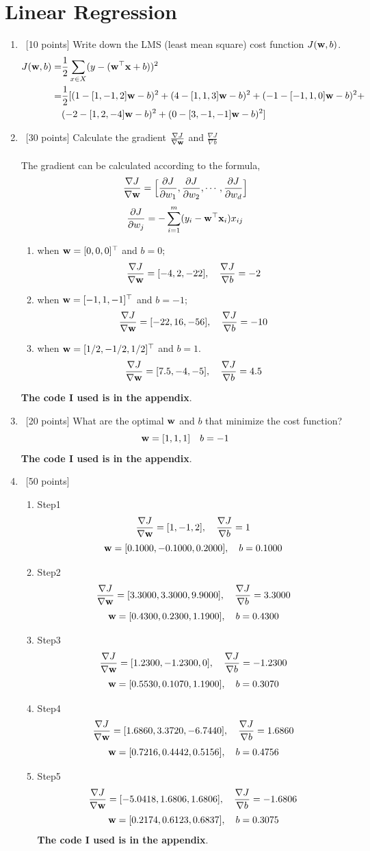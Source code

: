 \documentclass[12pt, fullpage,letterpaper]{article}
\newcommand{\bx}{{\bf x}}
\newcommand{\bw}{{\bf w}}
\begin{document}
\section{Linear Regression}
\begin{enumerate}
\item~[10 points] Write down the LMS (least mean square) cost function $J(\bw, b)$.
\begin{align*}
J(\bw, b)=&\frac{1}{2}\sum_{x\in X}(y-(\bw^\top \bx+b))^2\\
=&\frac{1}{2}[(1-[1,-1,2]\bw-b)^2+(4-[1,1,3]\bw-b)^2+(-1-[-1,1,0]\bw-b)^2+\\&(-2-[1,2,-4]\bw-b)^2+(0-[3,-1,-1]\bw-b)^2]
\end{align*}
\item~[30 points] Calculate the gradient $\frac{\nabla J}{\nabla \bw}$ and $\frac{\nabla J}{\nabla b}$\\\\
The gradient can be calculated according to the formula,
$$\frac{\nabla J}{\nabla \bw}=\Big[\frac{\partial J}{\partial w_1},\frac{\partial J}{\partial w_2},\cdots,\frac{\partial J}{\partial w_d}\Big]$$
$$\frac{\partial J}{\partial w_j}=-\sum_{i=1}^m(y_i-\bw^\top\bx_i)x_{ij}$$
\begin{enumerate}
\item when $\bw = [0,0,0]^\top$ and $b = 0$;
$$\frac{\nabla J}{\nabla \bw}=[-4,2,-22],\quad\frac{\nabla J}{\nabla b}=-2$$
\item when $\bw = [-1,1,-1]^\top$ and $b = -1$;
$$\frac{\nabla J}{\nabla \bw}=[-22,16,-56],\quad\frac{\nabla J}{\nabla b}=-10$$
\item when $\bw = [1/2,-1/2,1/2]^\top$ and $b = 1$.
$$\frac{\nabla J}{\nabla \bw}=[7.5,-4,-5],\quad\frac{\nabla J}{\nabla b}=4.5$$
\end{enumerate}
\textbf{The code I used is in the appendix}.
\item~[20 points] What are the optimal $\bw$ and $b$ that minimize the cost function? 
$$\bw=[1,1,1]\quad b=-1$$
\textbf{The code I used is in the appendix}.
\item~[50 points]
\begin{enumerate}
\item Step1
$$\frac{\nabla J}{\nabla \bw}=[1,-1,2],\quad\frac{\nabla J}{\nabla b}=1$$
$$\bw=[0.1000,-0.1000,0.2000],\quad b=0.1000$$
\item Step2
$$\frac{\nabla J}{\nabla \bw}=[3.3000,3.3000,9.9000],\quad\frac{\nabla J}{\nabla b}=3.3000$$
$$\bw=[0.4300,0.2300,1.1900],\quad b=0.4300$$
\item Step3
$$\frac{\nabla J}{\nabla \bw}=[1.2300,-1.2300,0],\quad\frac{\nabla J}{\nabla b}=-1.2300$$
$$\bw=[0.5530,0.1070,1.1900],\quad b=0.3070$$
\item Step4
$$\frac{\nabla J}{\nabla \bw}=[1.6860,3.3720,-6.7440],\quad\frac{\nabla J}{\nabla b}=1.6860$$
$$\bw=[0.7216,0.4442,0.5156],\quad b=0.4756$$
\item Step5
$$\frac{\nabla J}{\nabla \bw}=[-5.0418,1.6806,1.6806],\quad\frac{\nabla J}{\nabla b}=-1.6806$$
$$\bw=[0.2174,0.6123,0.6837],\quad b=0.3075$$
\textbf{The code I used is in the appendix}.
\end{enumerate}
\end{enumerate}
\end{document}
